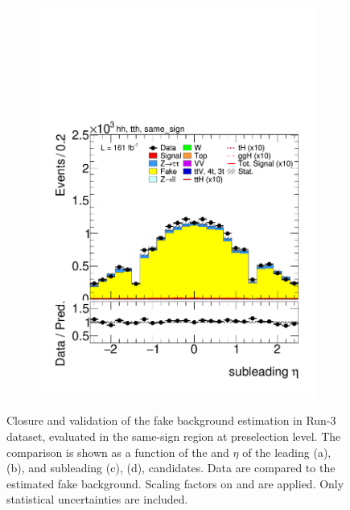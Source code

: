 \begin{figure}[htbp]
\begin{subfigure}[b]{0.45\textwidth}
      \includegraphics[width=\textwidth]{images/fakes_run3/plot_tau_1_eta_hh_tth_22_23_24_same_sign.pdf}
      \caption{}
    \end{subfigure}
  
    \caption{
      Closure and validation of the fake \tauhad background estimation in Run-3 dataset, evaluated in the same-sign region at preselection level.
      The comparison is shown as a function of the \pt and $\eta$ of the leading (a), (b), and subleading (c), (d), \tauhad candidates. 
      Data are compared to the estimated fake \tauhad background. Scaling factors on \ztautau and \ttbar are applied. Only statistical uncertainties are included.
    }
    \label{fig:closure_validation_run3}
  \end{figure}

